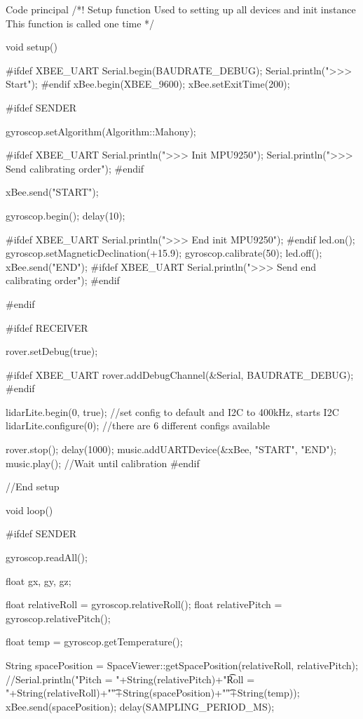 {\begin{Cpp}{Code principal}
/*!
  Setup function
  Used to setting up all devices and init instance
  This function is called one time
*/

void setup() {

#ifdef XBEE_UART
  Serial.begin(BAUDRATE_DEBUG);
	Serial.println(">>> Start");
#endif
	xBee.begin(XBEE_9600);
  xBee.setExitTime(200);


#ifdef SENDER
  
  gyroscop.setAlgorithm(Algorithm::Mahony);

#ifdef XBEE_UART
  Serial.println(">>> Init MPU9250");
  Serial.println(">>> Send calibrating order");
#endif

  xBee.send("START");

  gyroscop.begin();  
  delay(10);

#ifdef XBEE_UART  
  Serial.println(">>> End init MPU9250");
#endif
  led.on();  
  gyroscop.setMagneticDeclination(+15.9);
  gyroscop.calibrate(50);
  led.off();
  xBee.send("END");
#ifdef XBEE_UART
  Serial.println(">>> Send end calibrating order");
#endif
  
  
#endif


#ifdef RECEIVER

  rover.setDebug(true);

#ifdef XBEE_UART
  rover.addDebugChannel(&Serial, BAUDRATE_DEBUG);
#endif

  lidarLite.begin(0, true);   //set config to default and I2C to 400kHz, starts I2C
  lidarLite.configure(0);     //there are 6 different configs available
  
  rover.stop();
  delay(1000);
  music.addUARTDevice(&xBee, "START", "END");
  music.play();   //Wait until calibration
#endif

}//End setup

void loop() {

#ifdef SENDER

  gyroscop.readAll();

  float gx, gy, gz;

  float relativeRoll = gyroscop.relativeRoll();
  float relativePitch = gyroscop.relativePitch();

  float temp = gyroscop.getTemperature();
  
  String spacePosition = SpaceViewer::getSpacePosition(relativeRoll, relativePitch);
  //Serial.println("Pitch = "+String(relativePitch)+"\t Roll = "+String(relativeRoll)+"\t"+String(spacePosition)+"\t"+String(temp));
  xBee.send(spacePosition);
  delay(SAMPLING_PERIOD_MS);

}
\end{Cpp}}
